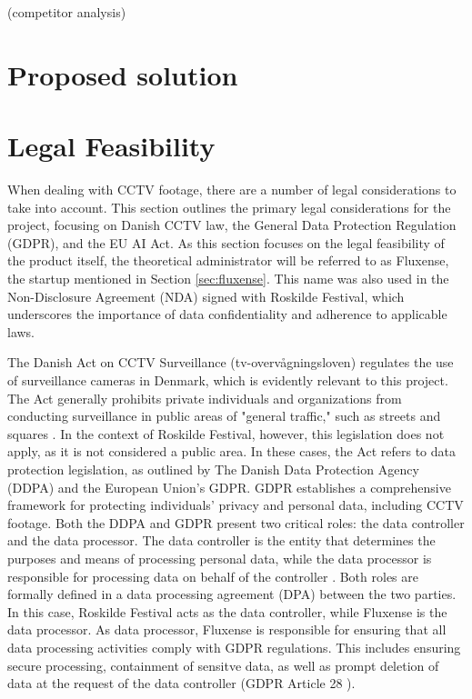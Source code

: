 (competitor analysis)

\section{Proposed solution}
\label{sec:solution}


\section{Legal Feasibility}
\label{sec:legal-feasibility}
When dealing with CCTV footage, there are a number of legal considerations to take into account. This section outlines the primary legal considerations for the project, focusing on Danish CCTV law, the General Data Protection Regulation (GDPR), and the EU AI Act. As this section focuses on the legal feasibility of the product itself, the theoretical administrator will be referred to as Fluxense, the startup mentioned in Section \ref{sec:fluxense}. This name was also used in the Non-Disclosure Agreement (NDA) signed with Roskilde Festival, which underscores the importance of data confidentiality and adherence to applicable laws.

The Danish Act on CCTV Surveillance (tv-overvågningsloven) regulates the use of surveillance cameras in Denmark, which is evidently relevant to this project. The Act generally prohibits private individuals and organizations from conducting surveillance in public areas of "general traffic," such as streets and squares \cite{cctv_law}. In the context of Roskilde Festival, however, this legislation does not apply, as it is not considered a public area. In these cases, the Act refers to data protection legislation, as outlined by The Danish Data Protection Agency (DDPA) and the European Union's GDPR. GDPR establishes a comprehensive framework for protecting individuals' privacy and personal data, including CCTV footage. Both the DDPA and GDPR present two critical roles: the data controller and the data processor. The data controller is the entity that determines the purposes and means of processing personal data, while the data processor is responsible for processing data on behalf of the controller \cite{gdpr_dpa}. Both roles are formally defined in a data processing agreement (DPA) between the two parties. In this case, Roskilde Festival acts as the data controller, while Fluxense is the data processor. As data processor, Fluxense is responsible for ensuring that all data processing activities comply with GDPR regulations. This includes ensuring secure processing, containment of sensitve data, as well as prompt deletion of data at the request of the data controller (GDPR Article 28 \cite{gdpr_article_28}).

